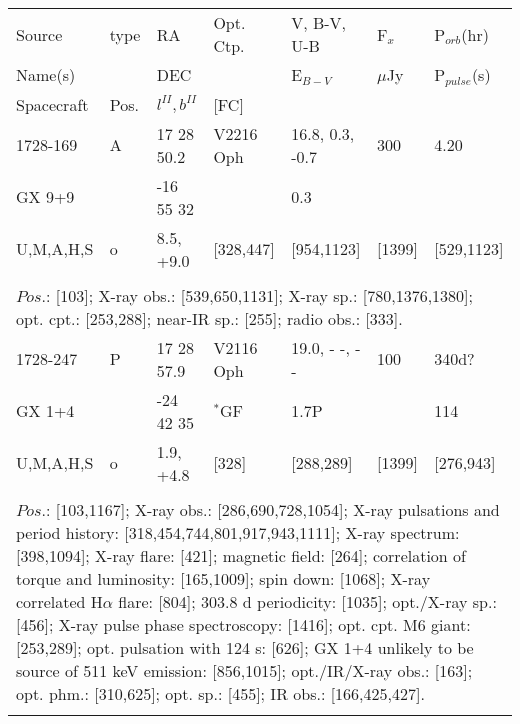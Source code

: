 \documentclass{aa}
\begin{document}
\begin{tabular}{p{2.5cm}p{1cm}p{1.8cm}p{2.3cm}p{3.3cm}p{2.0cm}p{2.2cm}}
\noalign{\smallskip}
\multicolumn{7}{p{17.5cm}}{Table 1.  (continued) }\\        

\hline
\noalign{\smallskip}
Source         & type  & RA                       &  Opt. Ctp. & V, B-V, U-B  & F$_{x}$          & P$_{orb}$(hr)    \\
Name(s)       &            & DEC                    &                     & E$_{B-V}$   & $\mu$Jy        & P$_{pulse}$(s) \\
Spacecraft & Pos.  & $l^{II}, b^{II}$      &  [FC]           &                        &                         &                             \\
\noalign{\smallskip} 
\hline

\noalign{\smallskip}
1728-169           & A            & 17 28 50.2          & V2216 Oph           & 16.8, 0.3, -0.7     & 300            & 4.20               \\
GX 9+9              &                & -16 55 32            &                                 & 0.3                        &                    &                \\
U,M,A,H,S         & o            & 8.5, +9.0              & [328,447]               & [954,1123]          & [1399]       & [529,1123]   \\
\\
\multicolumn{7}{p{17.5cm}}{
$Pos$.: [103]; X-ray obs.: [539,650,1131]; X-ray sp.: [780,1376,1380]; opt. cpt.: [253,288]; near-IR sp.: [255]; radio obs.: 
[333].}\\
\noalign{\smallskip}
\hline

\noalign{\smallskip}
1728-247        & P             & 17 28 57.9           & V2116 Oph     & 19.0, - -, - -          & 100            & 340d?        \\
GX 1+4           &                 & -24 42 35             & $^*$GF             & 1.7P                    &                    & 114             \\
U,M,A,H,S      & o             & 1.9, +4.8               & [328]                 & [288,289]           & [1399]        & [276,943]  \\
\\
\multicolumn{7}{p{17.5cm}}{
$Pos$.: [103,1167]; X-ray obs.: [286,690,728,1054]; X-ray pulsations and period history: [318,454,744,801,917,943,1111]; 
X-ray spectrum: [398,1094]; X-ray flare: [421]; magnetic field: [264]; correlation of torque and luminosity: [165,1009]; spin 
down: [1068]; X-ray correlated H$\alpha$ flare: [804]; 303.8 d periodicity: [1035]; opt./X-ray sp.: [456];  X-ray pulse phase 
spectroscopy: [1416]; opt. cpt. M6 giant: [253,289]; opt. pulsation with 124 s: [626]; GX 1+4 unlikely to be source 
of 511 keV emission: [856,1015]; opt./IR/X-ray obs.: [163]; opt. phm.: [310,625]; opt. sp.: [455]; IR obs.: [166,425,427].}\\
\noalign{\smallskip}
\hline


\end{tabular}
\end{document}
